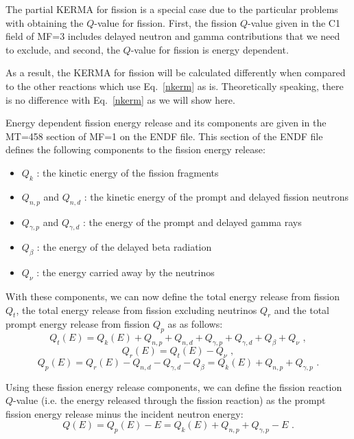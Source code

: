 The partial KERMA for fission is a special case due to the particular
problems with obtaining the $Q$-value for fission.
First, the fission $Q$-value given in the C1 field of MF=3 includes
delayed neutron and gamma contributions that we need to exclude,
and second, the $Q$-value for fission is energy dependent.

As a result, the KERMA for fission will be calculated differently
when compared to the other reactions which use Eq.~\ref{nkerm} as is.
Theoretically speaking, there is no difference with Eq.~\ref{nkerm}
as we will show here.

Energy dependent fission energy release and its components are given
in the MT=458 section of MF=1 on the ENDF file. This section of the
ENDF file defines the following components to the fission energy release:
\begin{itemize}
\item $Q_k$ : the kinetic energy of the fission fragments
\item $Q_{n,p}$ and $Q_{n,d}$ : the kinetic energy of the prompt and
      delayed fission neutrons
\item $Q_{\gamma,p}$ and $Q_{\gamma,d}$ : the energy of the prompt
      and delayed gamma rays
\item $Q_{\beta}$ : the energy of the delayed beta radiation
\item $Q_{\nu}$ : the energy carried away by the neutrinos
\end{itemize}

With these components, we can now define the total energy release
from fission $Q_t$, the total energy release from fission excluding
neutrinos $Q_r$ and the total prompt energy release from fission
$Q_p$ as as follows:
\begin{equation}
   Q_t(E) = Q_k(E) + Q_{n,p} + Q_{n,d} + Q_{\gamma,p} + Q_{\gamma,d}
          + Q_{\beta} + Q_{\nu}\,\,,
\end{equation}
\begin{equation}
   Q_r(E) = Q_t(E) - Q_{\nu}\,\,,
\end{equation}
\begin{equation}
   Q_p(E) = Q_r(E) - Q_{n,d} - Q_{\gamma,d} - Q_{\beta}
          = Q_k(E) + Q_{n,p} + Q_{\gamma,p}\,\,.
\end{equation}

Using these fission energy release components, we can define the
fission reaction $Q$-value (i.e. the energy released through the fission
reaction) as the prompt fission energy release minus the incident
neutron energy:
\begin{equation}
   Q(E) = Q_p(E) - E
        = Q_k(E) + Q_{n,p} + Q_{\gamma,p} - E\,\,.
\end{equation}

